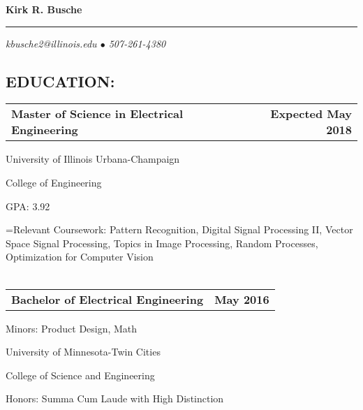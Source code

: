 \documentclass[10pt, letterpaper]{article}
\makeatletter
\newcommand{\headerrow}[2]
{\begin{tabular*}{\linewidth}{l@{\extracolsep{\fill}}r}
	#1 &
	#2 \\
\end{tabular*}}
\makeatother
\begin{document}
{\cabin \LARGE \textbf{Kirk R. Busche}}

\rule{\textwidth}{0.5ex}
\vspace{-2em}
\begin{center}
	{\cabin\small \textit{kbusche2@illinois.edu $\bullet$ 507-261-4380}}
\end{center}

\subsection*{\cabin EDUCATION:}
\headerrow
	{\textbf{Master of Science in Electrical Engineering}}
	{\textbf{Expected May 2018}}

University of Illinois Urbana-Champaign

College of Engineering

GPA: 3.92

{\newlength{\mylength}
\settowidth{\mylength}{Relevant Courseworks:}
\hangindent=\mylength Relevant Coursework: Pattern Recognition, Digital Signal Processing II, Vector Space Signal Processing, Topics in Image Processing, Random Processes, Optimization for Computer Vision}
\\
\\
\headerrow
	{\textbf{Bachelor of Electrical Engineering}}
	{\textbf{May 2016}}

Minors: Product Design, Math

University of Minnesota-Twin Cities

College of Science and Engineering

Honors: Summa Cum Laude with High Distinction
\end{document}

